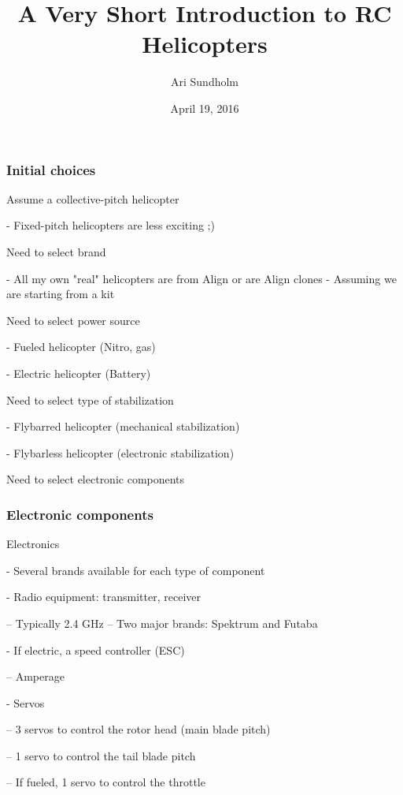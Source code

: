 \documentclass{beamer}
\title{A Very Short Introduction to RC Helicopters}
\author{Ari Sundholm}
\date{April 19, 2016}
\begin{document}
 
\frame{\titlepage}

\begin{frame}
\frametitle{Initial choices}

Assume a collective-pitch helicopter

- Fixed-pitch helicopters are less exciting ;)

Need to select brand

- All my own "real" helicopters are from Align or are Align clones
- Assuming we are starting from a kit

Need to select power source

- Fueled helicopter (Nitro, gas)

- Electric helicopter (Battery)

Need to select type of stabilization

- Flybarred helicopter (mechanical stabilization)

- Flybarless helicopter (electronic stabilization)

Need to select electronic components

\end{frame}

\begin{frame}
\frametitle{Electronic components}

Electronics

- Several brands available for each type of component

- Radio equipment: transmitter, receiver

-- Typically 2.4 GHz
-- Two major brands: Spektrum and Futaba

- If electric, a speed controller (ESC)

-- Amperage

- Servos

-- 3 servos to control the rotor head (main blade pitch)

-- 1 servo to control the tail blade pitch

-- If fueled, 1 servo to control the throttle


\end{frame}

\end{document}
